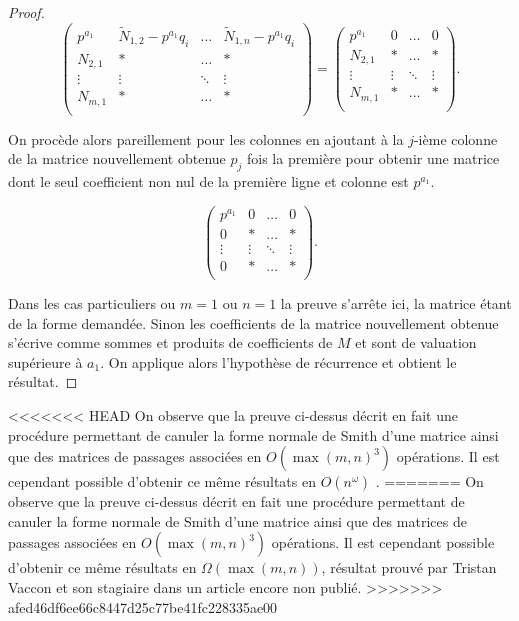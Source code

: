 \begin{proof}
	\[
 		\begin{pmatrix} p^{a_1}  & \tilde{N}_{1,2}- p^{a_1}  q_{i} & \ldots & \tilde{N}_{1,n}- p^{a_1}  q_{i} \\
			N_{2,1} & * & \ldots & *\\
			\vdots & \vdots & \ddots & \vdots \\
			N_{m,1} &* & \ldots & *\\
		\end{pmatrix} 
 = 		\begin{pmatrix} p^{a_1}& 0 & \ldots & 0 \\
			N_{2,1} & * & \ldots & *\\
			\vdots & \vdots & \ddots & \vdots \\
			N_{m,1} &* & \ldots & *\\
		\end{pmatrix} 
	.\] 

On procède alors pareillement pour les colonnes en ajoutant à la $j$-ième colonne de la matrice nouvellement obtenue $p_{j}$ fois la première pour obtenir une matrice dont le seul coefficient non nul de la première ligne et colonne est $p^{a_1}$.

	\[ 		\begin{pmatrix}  p^{a_1}& 0 & \ldots & 0 \\
			0 & * & \ldots & *\\
			\vdots & \vdots & \ddots & \vdots \\
			0 &* & \ldots & *\\
		\end{pmatrix} 
	.\] 

Dans les cas particuliers ou $m = 1$ ou $n=1$ la preuve s'arrête ici, la matrice étant de la forme demandée. 
Sinon les coefficients de la matrice nouvellement obtenue s'écrive comme sommes et produits de coefficients de $M$ et sont de valuation supérieure à $a_1$. On applique alors l'hypothèse de récurrence et obtient le résultat.
	\end{proof}

	\begin{remarques}
<<<<<<< HEAD
		On observe que la preuve ci-dessus décrit en fait une procédure permettant de canuler la forme normale de Smith d'une matrice ainsi que des matrices de passages associées en $O\left( \max\left( m,n \right) ^3 \right) $ opérations. Il est cependant possible d'obtenir ce même résultats en $O(n^{ \omega}) $  .
=======
		On observe que la preuve ci-dessus décrit en fait une procédure permettant de canuler la forme normale de Smith d'une matrice ainsi que des matrices de passages associées en $O\left( \max\left( m,n \right) ^3 \right) $ opérations. Il est cependant possible d'obtenir ce même résultats en $\Omega( \max(m,n)) $, résultat prouvé par Tristan Vaccon et son stagiaire dans un article encore non publié.
>>>>>>> afed46df6ee66c8447d25c77be41fc228335ae00
	\end{remarques}



